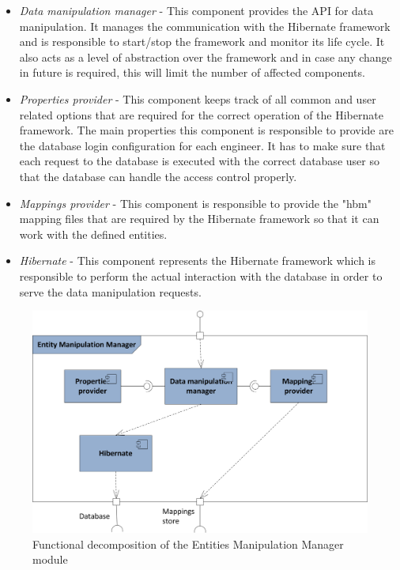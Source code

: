 \begin{itemize}
	\item \textit{Data manipulation manager} - This component provides the API for data manipulation. It manages the communication with the Hibernate framework and is responsible to start/stop the framework and monitor its life cycle. It also acts as a level of abstraction over the framework and in case any change in future is required, this will limit the number of affected components.
	
	\item \textit{Properties provider} - This component keeps track of all common and user related options that are required for the correct operation of the Hibernate framework. The main properties this component is responsible to provide are the database login configuration for each engineer. It has to make sure that each request to the database is executed with the correct database user so that the database can handle the access control properly.
	
	\item \textit{Mappings provider} - This component is responsible to provide the "hbm" mapping files that are required by the Hibernate framework so that it can work with the defined entities.
	
	\item \textit{Hibernate} - This component represents the Hibernate framework which is responsible to perform the actual interaction with the database in order to serve the data manipulation requests.  
\end{itemize}

\begin{figure}[h!]
  \centering
  	\includegraphics[scale=0.9]{storage/functional/func_manip.png}
  \caption{Functional decomposition of the Entities Manipulation Manager module}
  \label{fig:storageFuncManip}
\end{figure}

